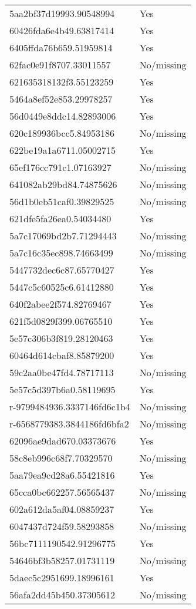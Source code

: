 \begin{tabular}{ll}
5aa2bf37d19993.90548994 & Yes \\
60426fda6e4b49.63817414 & Yes \\
6405ffda76b659.51959814 & Yes \\
62fac0e91f8707.33011557 & No/missing \\
621635318132f3.55123259 & Yes \\
5464a8ef52e853.29978257 & Yes \\
56d0449e8ddc14.82893006 & Yes \\
620c189936bcc5.84953186 & No/missing \\
622be19a1a6711.05002715 & Yes \\
65ef176cc791c1.07163927 & No/missing \\
641082ab29bd84.74875626 & No/missing \\
56d1b0eb51caf0.39829525 & No/missing \\
621dfe5fa26ea0.54034480 & Yes \\
5a7c17069bd2b7.71294443 & No/missing \\
5a7c16c35ec898.74663499 & No/missing \\
5447732dec6c87.65770427 & Yes \\
5447c5c60525c6.61412880 & Yes \\
640f2abee2f574.82769467 & Yes \\
621f5d0829f399.06765510 & Yes \\
5e57c306b3f819.28120463 & Yes \\
60464d614cbaf8.85879200 & Yes \\
59c2aa0be47fd4.78717113 & No/missing \\
5e57c5d397b6a0.58119695 & Yes \\
r-9799484936.3337146fd6c1b4 & No/missing \\
r-6568779383.3844186fd6bfa2 & No/missing \\
62096ae9dad670.03373676 & Yes \\
58c8eb996c68f7.70329570 & No/missing \\
5aa79ea9cd28a6.55421816 & Yes \\
65cca0bc662257.56565437 & No/missing \\
602a612da5af04.08859237 & Yes \\
6047437d724f59.58293858 & No/missing \\
56bc7111190542.91296775 & Yes \\
54646bf3b58257.01731119 & No/missing \\
5daec5c2951699.18996161 & Yes \\
56afa2dd45b450.37305612 & No/missing \\

\end{tabular}
